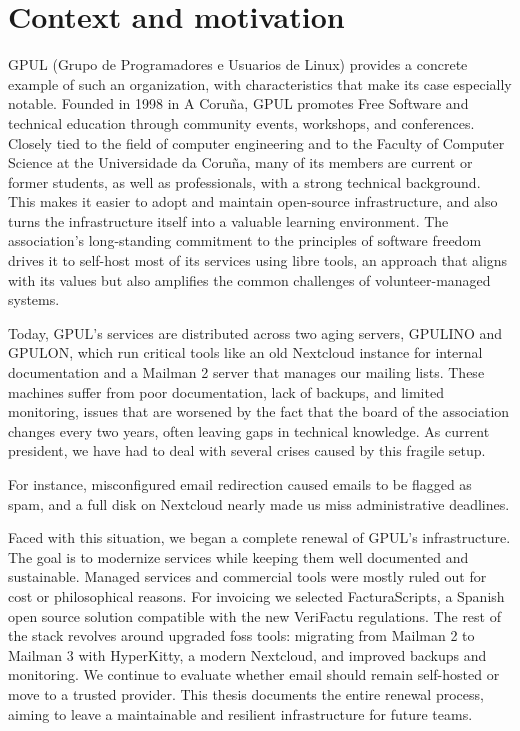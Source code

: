 \section{Context and motivation}

GPUL (Grupo de Programadores e Usuarios de Linux) \cite{gpul-web} provides a concrete example of such an organization, with characteristics that make its case especially notable. Founded in 1998 in A Coruña, GPUL promotes Free Software and technical education through community events, workshops, and conferences. Closely tied to the field of computer engineering and to the Faculty of Computer Science at the Universidade da Coruña, many of its members are current or former students, as well as professionals, with a strong technical background. This makes it easier to adopt and maintain open-source infrastructure, and also turns the infrastructure itself into a valuable learning environment. The association's long-standing commitment to the principles of software freedom drives it to self-host most of its services using libre tools, an approach that aligns with its values but also amplifies the common challenges of volunteer-managed systems.

Today, GPUL's services are distributed across two aging servers, GPULINO and GPULON, which run critical tools like an old Nextcloud instance for internal documentation and a Mailman 2 server that manages our mailing lists. These machines suffer from poor documentation, lack of backups, and limited monitoring, issues that are worsened by the fact that the board of the association changes every two years, often leaving gaps in technical knowledge. As current president, we have had to deal with several crises caused by this fragile setup.

For instance, misconfigured email redirection caused emails to be flagged as spam, and a full disk on Nextcloud nearly made us miss administrative deadlines.

Faced with this situation, we began a complete renewal of GPUL's infrastructure. The goal is to modernize services while keeping them well documented and sustainable. Managed services and commercial tools were mostly ruled out for cost or philosophical reasons. For invoicing we selected FacturaScripts\cite{facturascripts-antifraude}, a Spanish open source solution compatible with the new VeriFactu regulations\cite{boe-a-2024-22138}. The rest of the stack revolves around upgraded \gls{foss} tools: migrating from Mailman 2 to Mailman 3 with HyperKitty\cite{hyperkitty-web}, a modern Nextcloud, and improved backups and monitoring. We continue to evaluate whether email should remain self-hosted or move to a trusted provider. This thesis documents the entire renewal process, aiming to leave a maintainable and resilient infrastructure for future teams.

